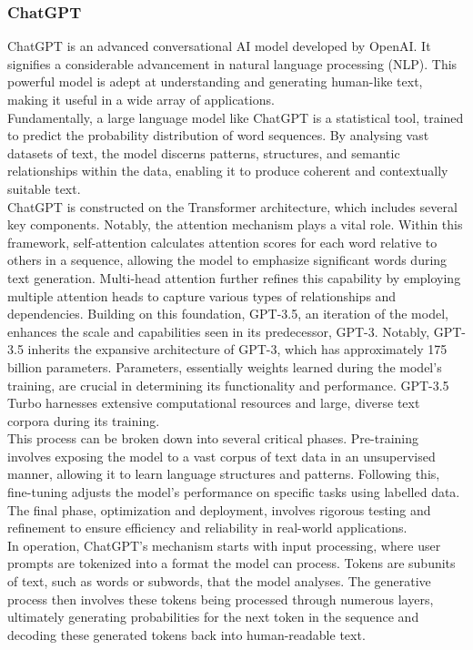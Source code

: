 \subsubsection*{ChatGPT}\label{sec:chatgpt}
ChatGPT is an advanced conversational AI model developed by OpenAI. It signifies a considerable advancement in natural language processing (NLP). This powerful model is adept at understanding and generating human-like text, making it useful in a wide array of applications.\\
Fundamentally, a large language model like ChatGPT is a statistical tool, trained to predict the probability distribution of word sequences. By analysing vast datasets of text, the model discerns patterns, structures, and semantic relationships within the data, enabling it to produce coherent and contextually suitable text.\\  
ChatGPT is constructed on the Transformer architecture, which includes several key components. Notably, the attention mechanism plays a vital role. Within this framework, self-attention calculates attention scores for each word relative to others in a sequence, allowing the model to emphasize significant words during text generation. Multi-head attention further refines this capability by employing multiple attention heads to capture various types of relationships and dependencies.  Building on this foundation, GPT-3.5, an iteration of the model, enhances the scale and capabilities seen in its predecessor, GPT-3. Notably, GPT-3.5 inherits the expansive architecture of GPT-3, which has approximately 175 billion parameters. Parameters, essentially weights learned during the model's training, are crucial in determining its functionality and performance. GPT-3.5 Turbo harnesses extensive computational resources and large, diverse text corpora during its training.\\
This process can be broken down into several critical phases. Pre-training involves exposing the model to a vast corpus of text data in an unsupervised manner, allowing it to learn language structures and patterns. Following this, fine-tuning adjusts the model's performance on specific tasks using labelled data. The final phase, optimization and deployment, involves rigorous testing and refinement to ensure efficiency and reliability in real-world applications.\\
In operation, ChatGPT's mechanism starts with input processing, where user prompts are tokenized into a format the model can process. Tokens are subunits of text, such as words or subwords, that the model analyses. The generative process then involves these tokens being processed through numerous layers, ultimately generating probabilities for the next token in the sequence and decoding these generated tokens back into human-readable text.


